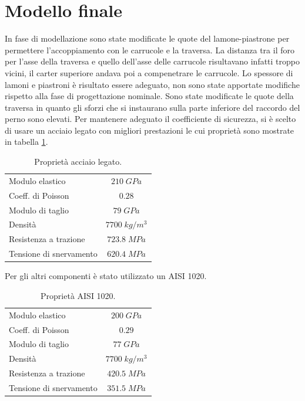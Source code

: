 \section{Modello finale}
In fase di modellazione sono state modificate le quote del lamone-piastrone per permettere l'accoppiamento con le carrucole e la traversa. 
La distanza tra il foro per l'asse della traversa e quello dell'asse delle carrucole risultavano infatti troppo vicini, il carter superiore andava poi a compenetrare le carrucole. 
Lo spessore di lamoni e piastroni è risultato essere adeguato, non sono state apportate modifiche rispetto alla fase di progettazione nominale.
Sono state modificate le quote della traversa in quanto gli sforzi che si instaurano sulla parte inferiore del raccordo del perno sono elevati. 
Per mantenere adeguato il coefficiente di sicurezza, si è scelto di usare un acciaio legato con migliori prestazioni le cui proprietà sono mostrate in tabella \ref{tab:PropLega}. 
\begin{table}[H]
\centering
\begin{tabular}{lc}
\toprule
Modulo elastico         & $210 \; GPa$    \\
Coeff. di Poisson       & $0.28$      \\
Modulo di taglio        & $79 \; GPa$     \\
Densità                 & $7700 \; kg/m^3$ \\
Resistenza a trazione   & $723.8 \; MPa$  \\
Tensione di snervamento & $620.4 \; MPa$ \\
\bottomrule
\end{tabular}
\caption{Proprietà acciaio legato.}
\label{tab:PropLega}
\end{table} 
Per gli altri componenti è stato utilizzato un AISI 1020.
\begin{table}[H]
\centering
\begin{tabular}{lc}
\toprule
Modulo elastico         & $200 \; GPa$    \\
Coeff. di Poisson       & $0.29$      \\
Modulo di taglio        & $77 \; GPa$     \\
Densità                 & $7700 \; kg/m^3$ \\
Resistenza a trazione   & $420.5 \; MPa$  \\
Tensione di snervamento & $351.5 \; MPa$ \\
\bottomrule
\end{tabular}
\caption{Proprietà AISI 1020.}
\label{tab:aisi1020}
\end{table} 
